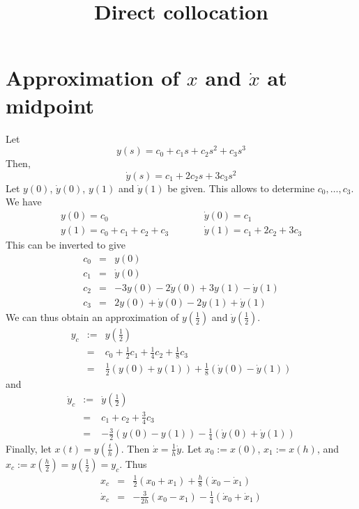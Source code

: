 \documentclass[a4paper]{article}
\title{Direct collocation}
\begin{document}
\maketitle
\section{Approximation of $x$ and $\dot{x}$ at midpoint}
Let
\begin{equation}
y(s) = c_0 + c_1 s + c_2 s^2 + c_3 s^3
\end{equation}
Then,
\begin{equation}
\dot{y}(s) = c_1 + 2 c_2 s + 3 c_3 s^2
\end{equation}
Let $y(0)$, $\dot{y}(0)$, $y(1)$ and $\dot{y}(1)$ be given. This allows to determine $c_0,\ldots,c_3$.
We have
\begin{eqnarray}
y(0) = c_0 &\qquad& \dot{y}(0) = c_1\\
y(1) = c_0 + c_1 + c_2 + c_3 &\qquad& \dot{y}(1) = c_1 + 2c_2 + 3c_3 \nonumber
\end{eqnarray}
This can be inverted to give
\begin{eqnarray}
c_0 &=& y(0)\\
c_1 &=& \dot{y}(0)\nonumber \\
c_2 &=& -3y(0) - 2\dot{y}(0) + 3y(1) - \dot{y}(1)\nonumber \\
c_3 &=& 2y(0) + \dot{y}(0) - 2y(1) + \dot{y}(1)\nonumber
\end{eqnarray}
We can thus obtain an approximation of $y(\frac{1}{2})$ and $\dot{y}(\frac{1}{2})$.
\begin{eqnarray}
y_c &:=& y(\frac{1}{2})\\
&=& c_0 + \frac{1}{2} c_1 + \frac{1}{4} c_2 + \frac{1}{8} c_3\nonumber \\
&=& \frac{1}{2} \left( y(0) + y(1) \right) + \frac{1}{8} \left( \dot{y}(0) - \dot{y}(1) \right)\nonumber
\end{eqnarray}
and
\begin{eqnarray}
\dot{y}_c &:=& \dot{y}(\frac{1}{2})\\
&=& c_1 + c_2 + \frac{3}{4} c_3\nonumber \\
&=& -\frac{3}{2} \left( y(0) - y(1) \right) - \frac{1}{4} \left( \dot{y}(0) + \dot{y}(1) \right) \nonumber
\end{eqnarray}
Finally, let $x(t) = y(\frac{t}{h})$. Then $\dot{x} = \frac{1}{h} \dot{y}$. Let $x_0 := x(0)$, $x_1 := x(h)$, and $x_c := x(\frac{h}{2}) = y(\frac{1}{2}) = y_c$. Thus
\begin{eqnarray}
x_c &=& \frac{1}{2}\left( x_0 + x_1 \right) + \frac{h}{8} \left( \dot{x}_0 - \dot{x}_1 \right)\\
\dot{x}_c &=& - \frac{3}{2h} \left( x_0 - x_1 \right) - \frac{1}{4} \left( \dot{x}_0 + \dot{x}_1 \right)
\end{eqnarray}
\end{document}

